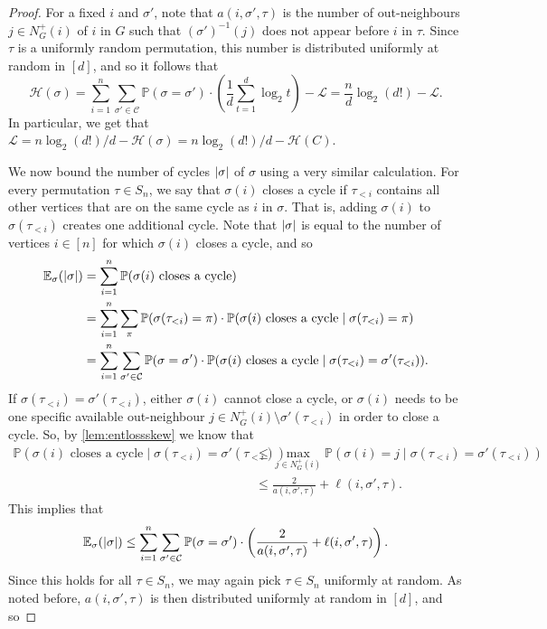 \documentclass[10pt,a4paper]{amsart}
\newcommand{\pr}{\mathbb{P}}
\newcommand{\ev}{\mathbb{E}}
\newcommand{\ent}{\mathcal{H}}
\newcommand{\cL}{\mathcal L}
\newcommand{\C}{\mathcal C}
\newcommand{\logt}{\log_2}
\DeclarePairedDelimiter{\abs}{\lvert}{\rvert}
\begin{document}
\begin{proof}
    For a fixed $i$ and $\sigma'$, note that $a(i,\sigma',\tau)$ is the number of out-neighbours $j \in N_G^+(i)$ of $i$ in $G$ such that $(\sigma')^{-1}(j)$ does not appear before $i$ in $\tau$. Since $\tau$ is a uniformly random permutation, this number is distributed uniformly at random in $[d]$, and so it follows that
    \[
        \ent(\sigma) = \sum_{i=1}^n \sum_{\sigma' \in \C} \pr(\sigma = \sigma') \cdot \left(\frac{1}{d} \sum_{t=1}^d \logt t\right) - \cL = \frac{n}{d} \logt(d!) - \cL.
    \]
    In particular, we get that $\cL = n \logt(d!) / d - \ent(\sigma) = n \logt(d!) / d - \ent(C)$.

    We now bound the number of cycles $\abs{\sigma}$ of $\sigma$ using a very similar calculation. For every permutation $\tau \in S_n$, we say that $\sigma(i)$ closes a cycle if $\tau_{<i}$ contains all other vertices that are on the same cycle as $i$ in $\sigma$. That is, adding $\sigma(i)$ to $\sigma(\tau_{<i})$ creates one additional cycle. Note that $\abs{\sigma}$ is equal to the number of vertices $i \in [n]$ for which $\sigma(i)$ closes a cycle, and so
    \begin{align*}
        \ev_\sigma(\abs{\sigma}) & = \sum_{i = 1}^n \pr(\sigma(i) \text{ closes a cycle}) \\
        & = \sum_{i=1}^n \sum_\pi \pr(\sigma(\tau_{<i}) = \pi) \cdot \pr(\sigma(i) \text{ closes a cycle} \mid \sigma(\tau_{<i}) = \pi) \\
        & = \sum_{i=1}^n \sum_{\sigma' \in \C} \pr(\sigma = \sigma') \cdot \pr(\sigma(i) \text{ closes a cycle} \mid \sigma(\tau_{<i}) = \sigma'(\tau_{<i})).
    \end{align*}
    If $\sigma(\tau_{<i}) = \sigma'(\tau_{<i})$, either $\sigma(i)$ cannot close a cycle, or $\sigma(i)$ needs to be one specific available out-neighbour $j \in N_G^+(i) \setminus \sigma'(\tau_{<i})$ in order to close a cycle. So, by \cref{lem:entlossskew} we know that
    \begin{align*}
        \pr(\sigma(i) \text{ closes a cycle} \mid \sigma(\tau_{<i}) = \sigma'(\tau_{<i})) & \le \max_{j \in N_G^+(i)} \pr(\sigma(i) = j \mid \sigma(\tau_{<i}) = \sigma'(\tau_{<i})) \\
        & \le \frac{2}{a(i,\sigma',\tau)} + \ell(i,\sigma',\tau).
    \end{align*}
    This implies that
    \[
        \ev_\sigma(\abs{\sigma}) \le \sum_{i=1}^n \sum_{\sigma' \in \C} \pr(\sigma = \sigma') \cdot \left(\frac{2}{a(i,\sigma',\tau)} + \ell(i,\sigma',\tau)\right).
    \]
    Since this holds for all $\tau \in S_n$, we may again pick $\tau \in S_n$ uniformly at random. As noted before, $a(i,\sigma',\tau)$ is then distributed uniformly at random in $[d]$, and so

\end{proof}
\end{document}
